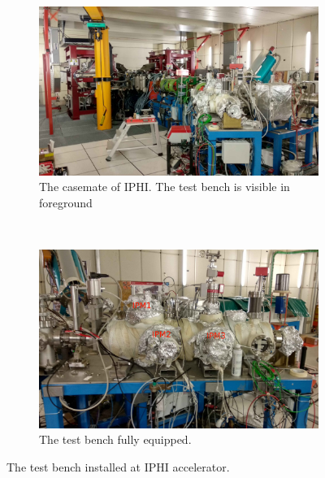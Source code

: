 \begin{figure}[!ht]
	\begin{subfigure}[t]{0.5\textwidth}
		\includegraphics[width=\textwidth]{04_IPHI_Test/figures/fig000_IPHI_tb1.jpg}
		\caption{The casemate of IPHI. The test bench is visible in foreground}
		\label{}
	\end{subfigure}
	~
	\begin{subfigure}[t]{0.5\textwidth}
		\includegraphics[width=\textwidth]{04_IPHI_Test/figures/fig000_IPHI_tb2.jpg}
		\caption{The test bench fully equipped.}
		\label{}
	\end{subfigure}
	\caption[The test bench installed at IPHI accelerator]{The test bench installed at IPHI accelerator.}
	\label{chap4:IPHI_tb}
\end{figure}
